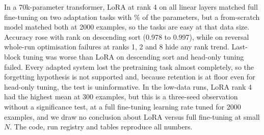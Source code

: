 In a 70k-parameter transformer, LoRA at rank 4 on all linear layers matched full fine-tuning on two adaptation tasks with \% of the parameters, but a from-scratch model matched both at 2000 examples, so the tasks are easy at that data size. Accuracy rose with rank on descending sort (0.978 to 0.997), while on reversal whole-run optimisation failures at ranks 1, 2 and 8 hide any rank trend. Last-block tuning was worse than LoRA on descending sort and head-only tuning failed. Every adapted system lost the pretraining task almost completely, so the forgetting hypothesis is not supported and, because retention is at floor even for head-only tuning, the test is uninformative. In the low-data runs, LoRA rank 4 had the highest mean at 300 examples, but this is a three-seed observation without a significance test, at a full fine-tuning learning rate tuned for 2000 examples, and we draw no conclusion about LoRA versus full fine-tuning at small $N$. The code, run registry and tables reproduce all numbers.
